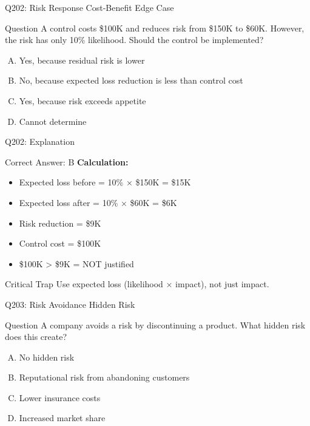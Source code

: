 \documentclass{beamer}
\begin{document}
	\begin{frame}{Q202: Risk Response Cost-Benefit Edge Case}
		\begin{block}{Question}
			A control costs \$100K and reduces risk from \$150K to \$60K. However, the risk has only 10\% likelihood. Should the control be implemented?
		\end{block}
		\begin{enumerate}[(A)]
			\item Yes, because residual risk is lower
			\item No, because expected loss reduction is less than control cost
			\item Yes, because risk exceeds appetite
			\item Cannot determine
		\end{enumerate}
	\end{frame}
	
	\begin{frame}{Q202: Explanation}
		\begin{block}{Correct Answer: B}
			\textbf{Calculation:}
			\begin{itemize}
				\item Expected loss before = 10\% × \$150K = \$15K
				\item Expected loss after = 10\% × \$60K = \$6K
				\item Risk reduction = \$9K
				\item Control cost = \$100K
				\item \$100K > \$9K = NOT justified
			\end{itemize}
		\end{block}
		\begin{alertblock}{Critical Trap}
			Use expected loss (likelihood × impact), not just impact.
		\end{alertblock}
	\end{frame}
	
	\begin{frame}{Q203: Risk Avoidance Hidden Risk}
		\begin{block}{Question}
			A company avoids a risk by discontinuing a product. What hidden risk does this create?
		\end{block}
		\begin{enumerate}[(A)]
			\item No hidden risk
			\item Reputational risk from abandoning customers
			\item Lower insurance costs
			\item Increased market share
		\end{enumerate}
	\end{frame}
	
\end{document}
